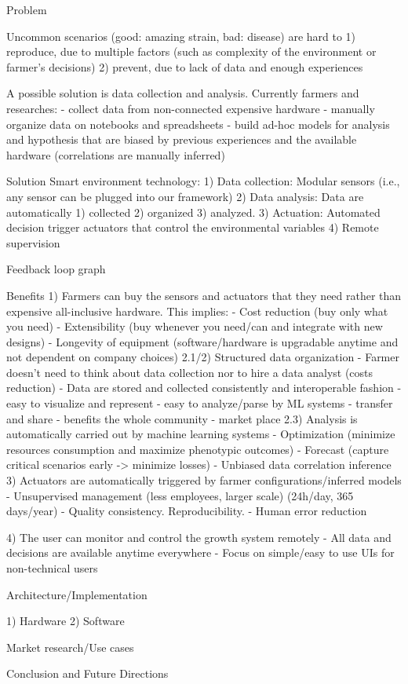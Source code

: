 Problem

Uncommon scenarios (good: amazing strain, bad: disease) are hard to
1) reproduce, due to multiple factors (such as complexity of the environment or farmer’s decisions)
2) prevent, due to lack of data and enough experiences 

A possible solution is data collection and analysis.
Currently farmers and researches:
- collect data from non-connected expensive hardware
- manually organize data on notebooks and spreadsheets
- build ad-hoc models for analysis and hypothesis that are biased by previous experiences and the available hardware (correlations are manually inferred)

Solution
Smart environment technology:
1) Data collection: Modular sensors (i.e., any sensor can be plugged into our framework)
2) Data analysis: Data are automatically 1) collected 2) organized 3) analyzed.
3) Actuation: Automated decision trigger actuators that control the environmental variables 
4) Remote supervision

Feedback loop graph


Benefits
1) Farmers can buy the sensors and actuators that they need rather than expensive all-inclusive hardware. This implies:
	- Cost reduction (buy only what you need)
	- Extensibility (buy whenever you need/can and integrate with new designs)
	- Longevity of equipment (software/hardware is upgradable anytime and not dependent on company choices)
2.1/2) Structured data organization
	- Farmer doesn’t need to think about data collection nor to hire a data analyst (costs reduction)
	- Data are stored and collected consistently and interoperable fashion
		- easy to visualize and represent
		- easy to analyze/parse by ML systems
		- transfer and share - benefits the whole community
		- market place
2.3) Analysis is automatically carried out by machine learning systems 
	- Optimization (minimize resources consumption and maximize phenotypic outcomes)
	- Forecast (capture critical scenarios early -> minimize losses)
	- Unbiased data correlation inference
3) Actuators are automatically triggered by farmer configurations/inferred models 
	- Unsupervised management (less employees, larger scale) (24h/day, 365 days/year)
	- Quality consistency. Reproducibility.
	- Human error reduction 
	
4) The user can monitor and control the growth system remotely
    - All data and decisions are available anytime everywhere 
    - Focus on simple/easy to use UIs for non-technical users


Architecture/Implementation

1) Hardware
2) Software


Market research/Use cases

Conclusion and Future Directions